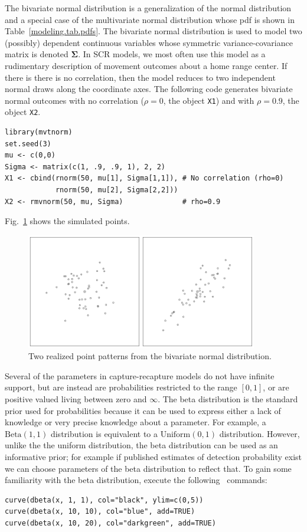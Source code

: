 The bivariate normal distribution is a generalization of the
normal distribution and a special case of the multivariate normal
distribution whose pdf is shown in Table~\ref{modeling.tab.pdfs}. The
bivariate normal distribution is used to model two (possibly) dependent
continuous variables whose symmetric variance-covariance matrix is
denoted $\bm{\Sigma}$.
In SCR models, we most often use this model as
a rudimentary description of movement outcomes about a home range
center. If there is there is no correlation, then the model reduces to
two independent normal draws along the coordinate axes. The following code generates bivariate normal
outcomes with no correlation ($\rho=0$, the object \verb+X1+) and with
$\rho=0.9$, the object \verb+X2+.
\begin{verbatim}
library(mvtnorm)
set.seed(3)
mu <- c(0,0)
Sigma <- matrix(c(1, .9, .9, 1), 2, 2)
X1 <- cbind(rnorm(50, mu[1], Sigma[1,1]), # No correlation (rho=0)
            rnorm(50, mu[2], Sigma[2,2]))
X2 <- rmvnorm(50, mu, Sigma)              # rho=0.9
\end{verbatim}
Fig.~\ref{modeling.fig.bvn} shows the simulated points.
\begin{figure}
  \centering
  \includegraphics[width=0.9\textwidth]{Ch2/figs/bvn}
  \caption{Two realized point patterns from the bivariate normal distribution. }
  \label{modeling.fig.bvn}
\end{figure}

Several of the parameters in capture-recapture models do not have
infinite support, but are instead are
probabilities restricted to the range $[0,1]$, or are positive valued
living between zero and $\infty$. The beta distribution is the
standard prior used for probabilities because it can be used to express either a
lack of knowledge or very precise knowledge about a
parameter. For example, a $\text{Beta}(1,1)$ distribution is
equivalent to a $\text{Uniform}(0, 1)$ distribution. However, unlike the
the uniform distribution, the beta distribution can be used as an
informative prior; for example if published estimates of detection
probability exist we can choose parameters of the beta distribution to
reflect that. To gain some familiarity with the beta
distribution, execute the following \R~commands:
\begin{verbatim}
curve(dbeta(x, 1, 1), col="black", ylim=c(0,5))
curve(dbeta(x, 10, 10), col="blue", add=TRUE)
curve(dbeta(x, 10, 20), col="darkgreen", add=TRUE)
\end{verbatim}

